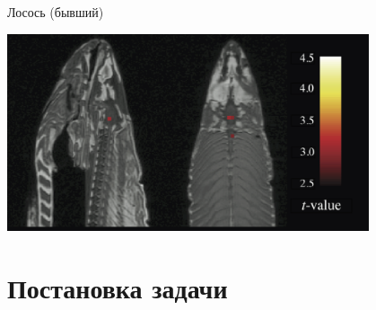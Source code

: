 \documentclass[9pt,pdf,utf8,hyperref={unicode},aspectratio=169]{beamer}
\begin{document}
\begin{frame}{Лосось (бывший)}
    \begin{center}
        \includegraphics[width=0.8\textwidth]{salmon.png}
    \end{center}
\end{frame}

\section{Постановка задачи}
\end{document}
